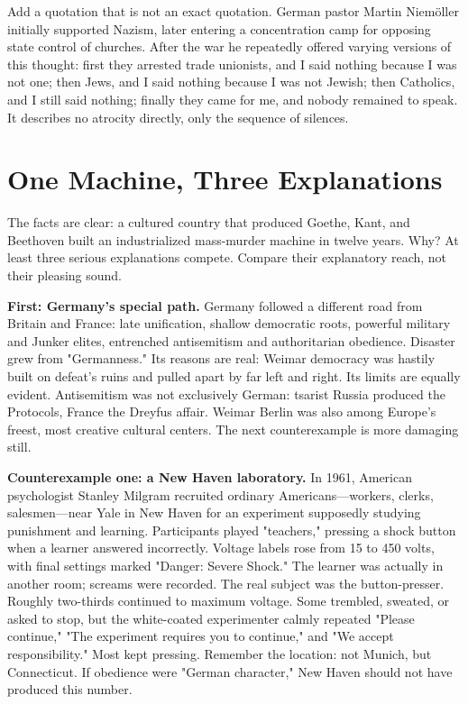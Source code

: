 Add a quotation that is not an exact quotation. German pastor Martin Niemöller initially supported Nazism, later entering a concentration camp for opposing state control of churches. After the war he repeatedly offered varying versions of this thought: first they arrested trade unionists, and I said nothing because I was not one; then Jews, and I said nothing because I was not Jewish; then Catholics, and I still said nothing; finally they came for me, and nobody remained to speak. It describes no atrocity directly, only the sequence of silences.

\section{One Machine, Three Explanations}
The facts are clear: a cultured country that produced Goethe, Kant, and Beethoven built an industrialized mass-murder machine in twelve years. Why? At least three serious explanations compete. Compare their explanatory reach, not their pleasing sound.

\textbf{First: Germany's special path.} Germany followed a different road from Britain and France: late unification, shallow democratic roots, powerful military and Junker elites, entrenched antisemitism and authoritarian obedience. Disaster grew from "Germanness." Its reasons are real: Weimar democracy was hastily built on defeat's ruins and pulled apart by far left and right. Its limits are equally evident. Antisemitism was not exclusively German: tsarist Russia produced the Protocols, France the Dreyfus affair. Weimar Berlin was also among Europe's freest, most creative cultural centers. The next counterexample is more damaging still.

\textbf{Counterexample one: a New Haven laboratory.} In 1961, American psychologist Stanley Milgram recruited ordinary Americans---workers, clerks, salesmen---near Yale in New Haven for an experiment supposedly studying punishment and learning. Participants played "teachers," pressing a shock button when a learner answered incorrectly. Voltage labels rose from 15 to 450 volts, with final settings marked "Danger: Severe Shock." The learner was actually in another room; screams were recorded. The real subject was the button-presser. Roughly two-thirds continued to maximum voltage. Some trembled, sweated, or asked to stop, but the white-coated experimenter calmly repeated "Please continue," "The experiment requires you to continue," and "We accept responsibility." Most kept pressing. Remember the location: not Munich, but Connecticut. If obedience were "German character," New Haven should not have produced this number.

